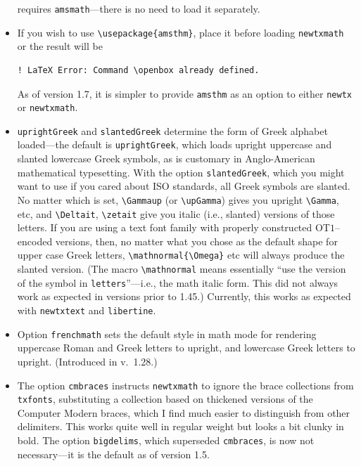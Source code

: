 \documentclass[\fsc]{article}
\theoremstyle{oldplain}
\theoremstyle{plain}
\begin{document}
\begin{itemize}
requires  {\tt amsmath}---there is no need to load it separately.
\item If you wish to use \verb|\usepackage{amsthm}|, place it before loading {\tt newtxmath} or the result will  be
\begin{verbatim}
! LaTeX Error: Command \openbox already defined.
\end{verbatim}
As of version 1.7, it is simpler to provide {\tt amsthm} as an option to either {\tt newtx} or {\tt newtxmath}.
\item {\tt uprightGreek} and {\tt slantedGreek} determine the form of Greek alphabet loaded---the default is {\tt uprightGreek}, which loads upright uppercase and slanted lowercase Greek symbols, as is customary in Anglo-American mathematical typesetting. With the option {\tt slantedGreek}, which you might want to use if you cared about ISO standards, all Greek symbols are slanted. No matter which is set, \verb|\Gammaup| (or \verb|\upGamma|) gives you upright \verb|\Gamma|, etc, and \verb|\Deltait|, \verb|\zetait| give you italic (i.e., slanted) versions of those letters. If you are using a text font family with properly constructed OT$1$--encoded versions, then, no matter what you chose as the default shape for upper case Greek letters, \verb|\mathnormal{\Omega}| etc will always produce the slanted version. (The macro \verb|\mathnormal| means essentially ``use the version of the symbol in {\tt letters}''---i.e., the math italic form. This did not always work as expected in versions prior to 1.45.) Currently, this works as expected with {\tt newtxtext} and {\tt libertine}. 
\item Option {\tt frenchmath} sets the default style in math mode for rendering uppercase Roman and Greek letters to upright, and lowercase Greek letters to upright. (Introduced in v.\ 1.28.)
\item The option {\tt cmbraces} instructs {\tt newtxmath} to ignore the brace collections from {\tt txfonts}, substituting a collection based on thickened versions of the Computer Modern braces, which I find much easier to distinguish from other delimiters. This works quite well in regular weight but looks a bit clunky in bold. The option {\tt bigdelims}, which superseded {\tt cmbraces}, is now not necessary---it is the default as of version 1.5.

\end{itemize}
\end{document}
